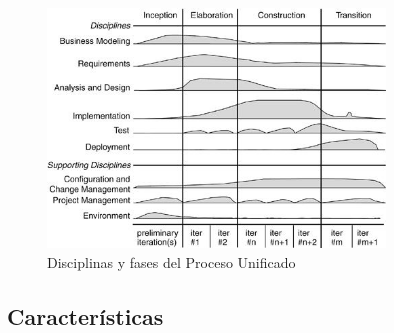 \begin{figure}[htbp]
  \centering
    \includegraphics[width=0.8\textwidth]{imagenes/rup}
        \hfill
	\caption{Disciplinas y fases del Proceso Unificado}
	\label{fig:rup}
\end{figure}

\subsection{Características}
    
